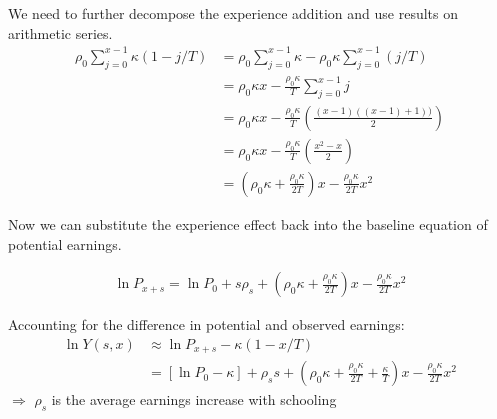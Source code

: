 \begin{frame}
We need to further decompose the experience addition and use results on arithmetic series.
\begin{align*}
\rho_0\sum_{j=0}^{x - 1} \kappa \left(1 - j/T\right) & = \rho_0 \sum_{j=0}^{x - 1} \kappa - \rho_0\kappa \sum_{j=0}^{x - 1} \left(j/T\right)\\
    & = \rho_0 \kappa x - \frac{\rho_0\kappa}{T} \sum_{j=0}^{x - 1} j\\
    & = \rho_0 \kappa x - \frac{\rho_0\kappa}{T} \left(\frac{(x - 1)((x - 1) + 1))}{2}\right) \\
    & = \rho_0 \kappa x - \frac{\rho_0\kappa}{T} \left(\frac{x^2 - x}{2}\right) \\
    & = \left(\rho_0 \kappa + \frac{\rho_0\kappa}{2T}\right) x - \frac{\rho_0\kappa}{2T} x^2
\end{align*}
\end{frame}
\begin{frame}
Now we can substitute the experience effect back into the baseline equation of potential earnings.

\begin{align*}
\ln{P_{x+s}} = \ln{P_0} + s \rho_s  + \left(\rho_0 \kappa + \frac{\rho_0\kappa}{2T}\right) x - \frac{\rho_0\kappa}{2T} x^2
\end{align*}
\end{frame}
\begin{frame}
Accounting for the difference in potential and observed earnings:
\begin{align*}
\ln{Y(s, x)} & \approx \ln{P_{x + s}} - \kappa\left(1 - x/T\right) \\
            & = [\ln{P_0} - \kappa] + \rho_s s + \left(\rho_0\kappa + \frac{\rho_0\kappa}{2T} + \frac{\kappa}{T}\right) x - \frac{\rho_0\kappa}{2T}x^2
\end{align*}
$\Rightarrow$ $\rho_s$ is the average earnings increase with schooling
\end{frame}
